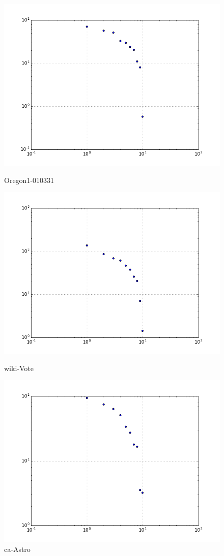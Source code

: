 \begin{figure}[H]
  \includegraphics[width=\linewidth]{img/oregon-010331/eig.png}
  \caption*{Oregon1-010331}
\endminipage\hfill
{}
  \includegraphics[width=\linewidth]{img/wiki-Vote/eig.png}
  \caption*{wiki-Vote}
\endminipage\hfill
{}
  \includegraphics[width=\linewidth]{img/ca-Astro/eig.png}
  \caption*{ca-Astro}
\endminipage
\end{figure}
